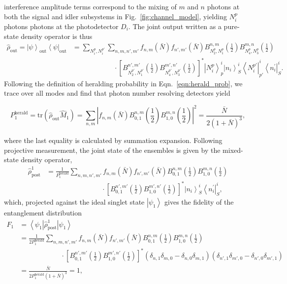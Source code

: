 \documentclass[aps,twocolumn,secnumarabic,amsmath,amssymb,pra,groupedaddress,
showpacs, showkeys]{revtex4-1}
\newcommand{\bra}[1]{\left\langle #1 \right|}
\newcommand{\ket}[1]{\left|#1\right\rangle}
\newcommand{\pna}[1]{\left(#1\right)}
\newcommand{\pnb}[1]{\left[#1\right]}
\newcommand{\eqn}[1]{
\begin{equation}
	#1
\end{equation}
}
\newcommand{\abs}[1]{\left|#1\right|}
\begin{document}
interference amplitude terms correspond to the mixing of $m$ and $n$ photons at
both the signal and idler subsystems in Fig.~\ref{fig:channel_model}, yielding
$N^p_i$ photons photons at the photodetector $D_i$. The joint output written as
a pure-state density operator is thus
\begin{align}
\hat{\rho}_{\textrm{out}} =\ket{\psi}_{\textrm{out}} \bra{\psi}_{\textrm{out}} & =\sum_{N_i^p, N_i^{p\prime}}\sum_{n,m,n',m'} f_{n,m}\pna{\bar{N}}f_{n',m'}\pna{\bar{N}} B_{N_2^p,N_1^p}^{n,m}\pna{\frac{1}{2}}  
B_{N_4^p,N_3^p}^{m,n}\pna{\frac{1}{2}} \nonumber \\
& \qquad\qquad\qquad\cdot  \pnb{B_{N_2^{p\prime},N_1^{p\prime}}^{n',m'}\pna{\frac{1}{2}}  
B_{N_4^{p\prime},N_3^{p\prime}}^{m',n'}\pna{\frac{1}{2}}}^*\ket{N_i^{p}}^i_p\ket{n_i}^i_S\bra{N_i^{p\prime}}^i_{p\prime}\bra{n_i^{\prime}}^i_S .\label{eqn:joint_state_lossless}
\end{align}
Following the definition of heralding probability in
Eqn.~\ref{eqn:herald_prob}, we trace over all modes and find that photon number
resolving detectors yield
\eqn{
	P_{1}^{\textrm{herald}}=\textrm{tr}\pna{\hat{\rho}_{\textrm{out}} \hat{M}_{1}} = \sum_{n,m} \abs{f_{n,m}\pna{\bar{N}} 
		B_{0,1}^{n,m}\pna{\frac{1}{2}} B_{1,0}^{m,n}\pna{\frac{1}{2}}}^2 =\frac{\bar{N}}{2\pna{1+\bar{N}}^3},\label{eq:chap3:lossless_prob}
}
where the last equality is calculated by summation expansion. Following
projective measurement, the joint state of the ensembles is given by the
mixed-state density operator,
\begin{align}
\hat{\rho}_{\textrm{post}}^{1} & = \frac{1}{P_{1}^{\textrm{herald}}}\sum_{n,m,n',m'} f_{n,m}\pna{\bar{N}}f_{n',m'}\pna{\bar{N}} B_{0,1}^{n,m}\pna{\frac{1}{2}}  
B_{1,0}^{m,n}\pna{\frac{1}{2}} \nonumber \\
& \qquad\qquad\qquad\qquad \cdot \pnb{B_{0,1}^{n',m'}\pna{\frac{1}{2}}  
B_{1,0}^{m',n'}\pna{\frac{1}{2}}}^*\ket{n_i}^i_S\bra{n_i^{\prime}}^i_S,\label{eqn:post:lossless}
\end{align}
which, projected against the ideal singlet state $\ket{\psi_{1}}$ gives the
fidelity of the entanglement distribution
\begin{align}
	F_{1}&=\bra{\psi_{1}}\hat{\rho}_{\textrm{post}}^{1} \ket{\psi_{1}} \nonumber \\
		& = \frac{1}{2P_{1}^{\textrm{herald}}}\sum_{n,m,n',m'} f_{n,m}\pna{\bar{N}}f_{n',m'}\pna{\bar{N}} B_{0,1}^{n,m}\pna{\frac{1}{2}}  
		B_{1,0}^{m,n}\pna{\frac{1}{2}}\nonumber \\ 
		& \qquad \qquad \qquad \cdot \pnb{B_{0,1}^{n',m'}\pna{\frac{1}{2}} B_{1,0}^{m',n'}\pna{\frac{1}{2}}}^*\pna{\delta_{n,1}\delta_{m,0}-\delta_{n,0}\delta_{m,1}}\pna{\delta_{n',1}\delta_{m',0}-\delta_{n',0}\delta_{m',1}} \nonumber \\
		& = \frac{\bar{N}}{2P_{1}^{\textrm{herald}}\pna{1+\bar{N}}^3}=1,
\end{align}
\end{document}
